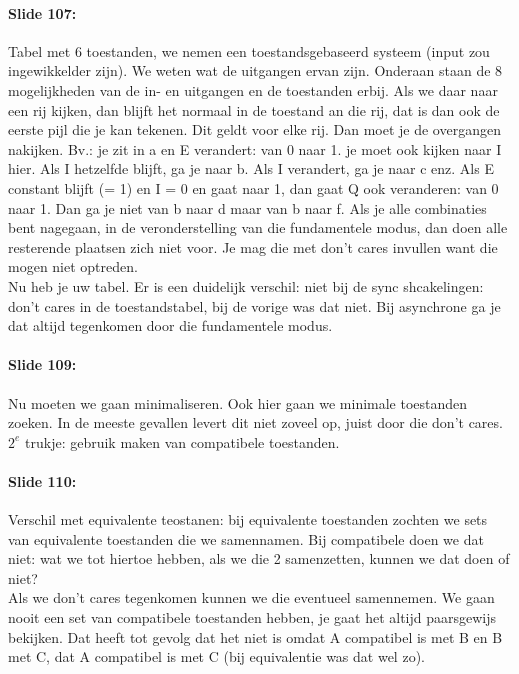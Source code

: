 \documentclass[10pt,a4paper]{book}
\begin{document}
\paragraph{Slide 107:} Tabel met 6 toestanden, we nemen een toestandsgebaseerd systeem (input zou ingewikkelder zijn). We weten wat de uitgangen ervan zijn. Onderaan staan de 8 mogelijkheden van de in- en uitgangen en de toestanden erbij. Als we daar naar een rij kijken, dan blijft het normaal in de toestand an die rij, dat is dan ook de eerste pijl die je kan tekenen. Dit geldt voor elke rij. Dan moet je de overgangen nakijken. Bv.: je zit in a en E verandert: van 0 naar 1. je moet ook kijken naar I hier. Als I hetzelfde blijft, ga je naar b. Als I verandert, ga je naar c enz. Als E constant blijft (= 1) en I = 0 en gaat naar 1, dan gaat Q ook veranderen: van 0 naar 1. Dan ga je niet van b naar d maar van b naar f. Als je alle combinaties bent nagegaan, in de veronderstelling van die fundamentele modus, dan doen alle resterende plaatsen zich niet voor. Je mag die met don't cares invullen want die mogen niet optreden.\\
Nu heb je uw tabel. Er is een duidelijk verschil: niet bij de sync shcakelingen: don't cares in de toestandstabel, bij de vorige was dat niet. Bij asynchrone ga je dat altijd tegenkomen door die fundamentele modus.

\paragraph{Slide 109:} Nu moeten we gaan minimaliseren. Ook hier gaan we minimale toestanden zoeken. In de meeste gevallen levert dit niet zoveel op, juist door die don't cares. $2^e$ trukje: gebruik maken van compatibele toestanden. 

\paragraph{Slide 110:} Verschil met equivalente teostanen: bij equivalente toestanden zochten we sets van equivalente toestanden die we samennamen. Bij compatibele doen we dat niet: wat we tot hiertoe hebben, als we die 2 samenzetten, kunnen we dat doen of niet?\\
Als we don't cares tegenkomen kunnen we die eventueel samennemen. We gaan nooit een set van compatibele toestanden hebben, je gaat het altijd paarsgewijs bekijken. Dat heeft tot gevolg dat het niet is omdat A compatibel is met B en B met C, dat A compatibel is met C (bij equivalentie was dat wel zo).
\end{document}

